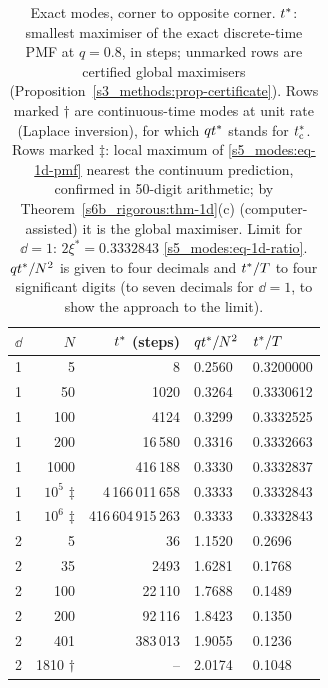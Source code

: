 \begin{table}[tbp]
\centering
\caption{Exact modes, corner to opposite corner. $t^{*}$: smallest maximiser of the exact discrete-time PMF at
$q=0.8$, in steps; unmarked rows are certified global maximisers (Proposition~\ref{s3_methods:prop-certificate}).
Rows marked $\dagger$ are continuous-time modes at unit rate (Laplace inversion), for which $qt^{*}$ stands for
$t^{*}_{\mathrm{c}}$. Rows marked $\ddagger$: local maximum of \eqref{s5_modes:eq-1d-pmf} nearest the continuum prediction,
confirmed in 50-digit arithmetic; by Theorem~\ref{s6b_rigorous:thm-1d}(c) (computer-assisted) it is the global
maximiser. Limit for $\dd=1$: $2\xi^{*}=0.3332843$ \eqref{s5_modes:eq-1d-ratio}. $qt^{*}/N^{2}$ is given to four
decimals and $t^{*}/T$ to four significant digits (to seven decimals for $\dd=1$, to show the approach to the
limit).}
\label{s5_modes:tab-modes}
\small
\begin{tabular}{@{}rrrll@{}}
\toprule
$\dd$ & $N$ & $t^{*}$ (steps) & $qt^{*}/N^{2}$ & $t^{*}/T$\\
\midrule
1 & 5 & 8 & 0.2560 & 0.3200000\\
1 & 50 & 1020 & 0.3264 & 0.3330612\\
1 & 100 & 4124 & 0.3299 & 0.3332525\\
1 & 200 & 16\,580 & 0.3316 & 0.3332663\\
1 & 1000 & 416\,188 & 0.3330 & 0.3332837\\
1 & $10^{5}$ $\ddagger$ & 4\,166\,011\,658 & 0.3333 & 0.3332843\\
1 & $10^{6}$ $\ddagger$ & 416\,604\,915\,263 & 0.3333 & 0.3332843\\
\midrule
2 & 5 & 36 & 1.1520 & 0.2696\\
2 & 35 & 2493 & 1.6281 & 0.1768\\
2 & 100 & 22\,110 & 1.7688 & 0.1489\\
2 & 200 & 92\,116 & 1.8423 & 0.1350\\
2 & 401 & 383\,013 & 1.9055 & 0.1236\\
2 & 1810 $\dagger$ & -- & 2.0174 & 0.1048\\

\end{tabular}
\end{table}
